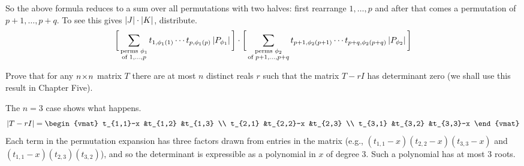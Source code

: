 \begin{exercises}
\begin{answer}
      So the above formula reduces to a sum over all permutations
      with two halves:
      first rearrange \( 1,\dots,p \) and after that comes
      a permutation of
      \( p+1,\dots,p+q \).
      To see this gives \( \deter{J}\cdot\deter{K}  \), distribute.
      \begin{equation*}
         \bigg[\sum_{\substack{\text{\scriptsize perms }\phi_1 \\
                              \text{\scriptsize of } 1,\dots,p}}
               t_{1,\phi_1(1)}\cdots t_{p,\phi_1(p)} 
               \deter{P_{\phi_1}}                            \bigg]\cdot
         \bigg[\sum_{\substack{\text{\scriptsize perms }\phi_2 \\
                              \text{\scriptsize of } p+1,\dots,p+q}}
               t_{p+1,\phi_2(p+1)}\cdots t_{p+q,\phi_2(p+q)} 
               \deter{P_{\phi_2}}                          \bigg]
      \end{equation*}  
    \end{answer}
  \recommended \item
    Prove that for any \( n \! \times \! n \) matrix \( T \) there are at most
    \( n \) distinct reals \( r \) such that the matrix \( T-rI \) has
    determinant zero
    (we shall use this result in Chapter Five).
    \begin{answer}
      The $n=3$ case shows what happens.
      \begin{equation*}
        \deter{T-rI}
        =
        \begin{vmat}
          t_{1,1}-x  &t_{1,2}   &t_{1,3}  \\ 
          t_{2,1}    &t_{2,2}-x &t_{2,3}  \\ 
          t_{3,1}    &t_{3,2}   &t_{3,3}-x  
        \end{vmat}
      \end{equation*}
      Each term in the permutation expansion has three factors drawn from 
      entries in the matrix (e.g., $(t_{1,1}-x)(t_{2,2}-x)(t_{3,3}-x)$
      and $(t_{1,1}-x)(t_{2,3})(t_{3,2})$), and so the determinant is
      expressible as a polynomial in $x$ of degree $3$.
      Such a polynomial has at most $3$ roots.


\end{answer}
\end{exercises}
